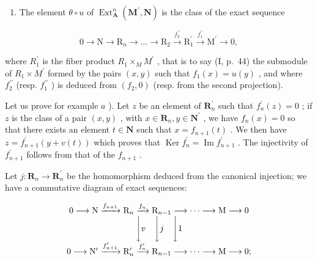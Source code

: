 \begin{enumerate}
\def\labelenumi{\alph{enumi})}
\setcounter{enumi}{1}
\tightlist
\item
  The element \(\theta \circ u\) of \(\operatorname{Ext}_{\mathbf{A}}^{n}(\mathbf{M}^{\prime}, \mathbf{N})\) is the class of the exact sequence
\end{enumerate}

\[
0 \rightarrow \mathrm{N} \rightarrow \mathrm{R} _ {n} \rightarrow \dots \rightarrow \mathrm{R} _ {2} \xrightarrow {f _ {2} ^ {\prime \prime}} \mathrm{R} _ {1} ^ {\prime} \xrightarrow {f _ {1} ^ {\prime \prime}} \mathrm{M} ^ {\prime} \rightarrow 0,
\]

where \(R_{1}^{\prime}\) is the fiber product \(R_{1} \times_{M} M^{\prime}\) , that is to say (I, p.~44) the submodule of \(R_{1} \times M^{\prime}\) formed by the pairs \((x, y)\) such that \(f_{1}(x) = u(y)\) , and where \(f_{2}^{\prime\prime}\) (resp. \(f_{1}^{\prime\prime}\) ) is deduced from \((f_{2}, 0)\) (resp. from the second projection).

Let us prove for example \(a\) ). Let \(z\) be an element of \(\mathbf{R}_{n}^{\prime}\) such that \(f_{n}^{\prime}(z)=0\) ; if \(z\) is the class of a pair \((x,y)\) , with \(x\in\mathbf{R}_{n},y\in\mathbf{N}^{\prime}\) , we have \(f_{n}(x)=0\) so that there exists an element \(t\in\mathbf{N}\) such that \(x=f_{n+1}(t)\) . We then have \(z=f_{n+1}^{\prime}(y+v(t))\) which proves that \(\operatorname{Ker} f_{n}^{\prime}=\operatorname{Im} f_{n+1}^{\prime}\) . The injectivity of \(f_{n+1}^{\prime}\) follows from that of the \(f_{n+1}\) .

Let \(j: \mathbf{R}_{n} \to \mathbf{R}_{n}^{\prime}\) be the homomorphism deduced from the canonical injection; we have a commutative diagram of exact sequences:

\[
\begin{array}{c} 0 \longrightarrow \mathrm{N} \xrightarrow {f _ {n + 1}} \mathrm{R} _ {n} \xrightarrow {f _ {n}} \mathrm{R} _ {n - 1} \longrightarrow \dots \longrightarrow \mathrm{M} \longrightarrow 0 \\ \Biggl \downarrow v \quad \Biggl \downarrow j \quad \Biggl \downarrow 1 \\ 0 \longrightarrow \mathrm{N} ^ {\prime} \xrightarrow {f _ {n + 1} ^ {\prime}} \mathrm{R} _ {n} ^ {\prime} \xrightarrow {f _ {n} ^ {\prime}} \mathrm{R} _ {n - 1} \longrightarrow \dots \longrightarrow \mathrm{M} \longrightarrow 0; \end{array}
\]

